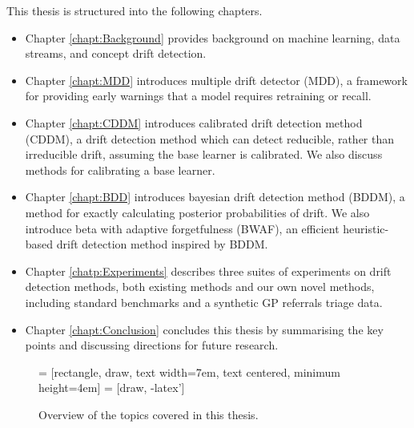 This thesis is structured into the following chapters.
\begin{itemize}
    \item Chapter \ref{chapt:Background} provides background on machine learning, data streams, and concept drift detection.
    \item Chapter \ref{chapt:MDD} introduces multiple drift detector (MDD), a framework  for providing early warnings that a model requires retraining or recall.
    \item Chapter \ref{chapt:CDDM} introduces calibrated drift detection method (CDDM), a drift detection method which can detect reducible, rather than irreducible drift, assuming the base learner is calibrated. We also discuss methods for calibrating a base learner.
    \item Chapter \ref{chapt:BDD} introduces bayesian drift detection method (BDDM), a method for exactly calculating posterior probabilities of drift. We also introduce beta with adaptive forgetfulness (BWAF), an efficient heuristic-based drift detection method inspired by BDDM.
    \item Chapter \ref{chatp:Experiments} describes three suites of experiments on drift detection methods, both existing methods and our own novel methods, including standard benchmarks and a synthetic GP referrals triage data.
    \item Chapter \ref{chapt:Conclusion} concludes this thesis by summarising the key points and discussing directions for future research.
\end{itemize}

\begin{figure}
    \centering
     = [rectangle, draw, 
    text width=7em, text centered, minimum height=4em]
     = [draw, -latex']
    \caption{Overview of the topics covered in this thesis.}
    \label{fig:overview_topics}
\end{figure}








